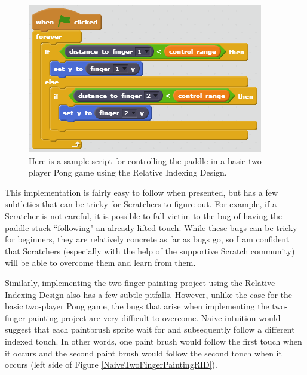 \begin{figure}
\centering
\includegraphics{images/BasicTwoPlayerPongRID.PNG}
\caption[Sample Relative Indexing Design Script for Basic Two-Player Pong]{Here is a sample script for controlling the paddle in a basic two-player Pong game using the Relative Indexing Design.}
\label{BasicTwoPlayerPongRID}
\end{figure}

This implementation is fairly easy to follow when presented, but has a few subtleties that can be tricky for Scratchers to figure out. For example, if a Scratcher is not careful, it is possible to fall victim to the bug of having the paddle stuck ``following" an already lifted touch. While these bugs can be tricky for beginners, they are relatively concrete as far as bugs go, so I am confident that Scratchers (especially with the help of the supportive Scratch community) will be able to overcome them and learn from them. 

Similarly, implementing the two-finger painting project using the Relative Indexing Design also has a few subtle pitfalls. However, unlike the case for the basic two-player Pong game, the bugs that arise when implementing the two-finger painting project are very difficult to overcome. Naive intuition would suggest that each paintbrush sprite wait for and subsequently follow a different indexed touch. In other words, one paint brush would follow the first touch when it occurs and the second paint brush would follow the second touch when it occurs (left side of Figure \ref{NaiveTwoFingerPaintingRID}).

